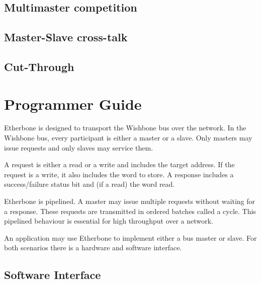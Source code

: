 \documentclass{article}
\begin{document}
\subsection{Multimaster competition}

\subsection{Master-Slave cross-talk}

\subsection{Cut-Through}

\section{Programmer Guide}

Etherbone is designed to transport the Wishbone bus over the network.
In the Wishbone bus, every participant is either a master or a slave.
Only masters may issue requests and only slaves may service them.

A request is either a read or a write and includes the target address.
If the request is a write, it also includes the word to store.
A response includes a success/failure status bit and (if a read) the word read.

Etherbone is pipelined.
A master may issue multiple requests without waiting for a response.
These requests are transmitted in ordered batches called a cycle.
This pipelined behaviour is essential for high throughput over a network.

An application may use Etherbone to implement either a bus master or slave.
For both scenarios there is a hardware and software interface.

\subsection{Software Interface}
\end{document}
